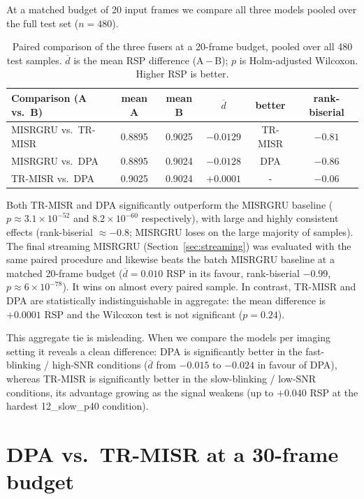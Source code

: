 At a matched budget of 20 input frames we compare all three models pooled over
the full test set ($n = 480$).

\begin{table}[htbp]
  \centering
  \caption{Paired comparison of the three fusers at a 20-frame budget, pooled over
           all 480 test samples. $\overline{d}$ is the mean RSP difference
           (A\,$-$\,B); $p$ is Holm-adjusted Wilcoxon. Higher RSP is better.}
  \label{tab:sig_20f}
  \begin{tabular}{lccccc}
    \toprule
    \textbf{Comparison (A vs.\ B)} & \textbf{mean A} & \textbf{mean B} &
    $\overline{d}$ & \textbf{better} & \textbf{rank-biserial} \\
    \midrule
    MISRGRU vs.\ TR-MISR & 0.8895 & 0.9025 & $-0.0129$ & TR-MISR & $-0.81$ \\
    MISRGRU vs.\ DPA     & 0.8895 & 0.9024 & $-0.0128$ & DPA     & $-0.86$ \\
    TR-MISR vs.\ DPA     & 0.9025 & 0.9024 & $+0.0001$ & - & $-0.06$ \\
    \bottomrule
  \end{tabular}
\end{table}

Both TR-MISR and DPA significantly outperform the MISRGRU baseline
($p \approx 3.1\times10^{-52}$ and $8.2\times10^{-60}$ respectively), with large
and highly consistent effects (rank-biserial $\approx -0.8$; MISRGRU loses on the
large majority of samples). The final streaming MISRGRU
(Section~\ref{sec:streaming}) was evaluated with the same paired procedure and
likewise beats the batch MISRGRU baseline at a matched 20-frame budget
($\overline{d} = 0.010$ RSP in its favour, rank-biserial $-0.99$,
$p \approx 6\times10^{-78}$). It wins on almost every paired sample. In contrast, TR-MISR and DPA are
statistically indistinguishable in aggregate: the mean difference is
$+0.0001$ RSP and the Wilcoxon test is not significant ($p = 0.24$).

This aggregate tie is misleading. When we compare the models per imaging setting it
reveals a clean difference: DPA is significantly better in the fast-blinking /
high-SNR conditions ($\overline{d}$ from $-0.015$ to $-0.024$ in favour of DPA),
whereas TR-MISR is significantly better in the slow-blinking / low-SNR
conditions, its advantage growing as the signal weakens (up to $+0.040$ RSP at
the hardest 12\_slow\_p40 condition). 

\section*{DPA vs.\ TR-MISR at a 30-frame budget}
\label{appsec:sig_30f}

